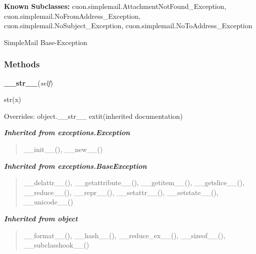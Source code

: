 \textbf{Known Subclasses:}
cuon.simplemail.AttachmentNotFound\_Exception,
    cuon.simplemail.NoFromAddress\_Exception,
    cuon.simplemail.NoSubject\_Exception,
    cuon.simplemail.NoToAddress\_Exception

SimpleMail Base-Exception



  \subsubsection{Methods}

    \vspace{0.5ex}

\hspace{.8\funcindent}\begin{boxedminipage}{\funcwidth}

    \raggedright \textbf{\_\_str\_\_}(\textit{self})

\setlength{\parskip}{2ex}
    str(x)

\setlength{\parskip}{1ex}
      Overrides: object.\_\_str\_\_ 	extit{(inherited documentation)}

    \end{boxedminipage}


\large{\textbf{\textit{Inherited from exceptions.Exception}}}

\begin{quote}
\_\_init\_\_(), \_\_new\_\_()
\end{quote}

\large{\textbf{\textit{Inherited from exceptions.BaseException}}}

\begin{quote}
\_\_delattr\_\_(), \_\_getattribute\_\_(), \_\_getitem\_\_(), \_\_getslice\_\_(), \_\_reduce\_\_(), \_\_repr\_\_(), \_\_setattr\_\_(), \_\_setstate\_\_(), \_\_unicode\_\_()
\end{quote}

\large{\textbf{\textit{Inherited from object}}}

\begin{quote}
\_\_format\_\_(), \_\_hash\_\_(), \_\_reduce\_ex\_\_(), \_\_sizeof\_\_(), \_\_subclasshook\_\_()
\end{quote}


